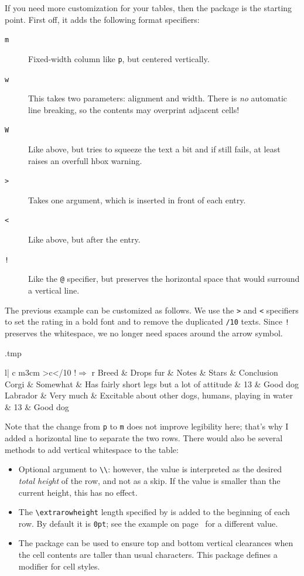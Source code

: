 If you need more customization for your tables, then the  package is the starting point.
First off, it adds the following format specifiers:
\begin{description}
\item[\texttt{m}] Fixed-width column like \verb|p|, but centered vertically.
\item[\texttt{w}] This takes two parameters: alignment and width.
    There is \emph{no} automatic line breaking,
    so the contents may overprint adjacent cells!
\item[\texttt{W}] Like above, but tries to squeeze the text a bit and if still fails,
    at least raises an overfull hbox warning.
\item[\texttt{>}] Takes one argument, which is inserted in front of each entry.
\item[\texttt{<}] Like above, but after the entry.
\item[\texttt{!}] Like the \verb|@| specifier,
    but preserves the horizontal space that would surround a vertical line.
\end{description}

The previous example can be customized as follows.
We use the \verb|>| and \verb|<| specifiers to set the rating in a bold font
and to remove the duplicated \verb|/10| texts.
Since \verb|!| preserves the whitespace,
we no longer need spaces around the arrow symbol.
%
\begin{VerbatimOut}{\jobname.tmp}
\begin{tabular}{l| c m{3cm} >{\bfseries}c<{/10} !{$\Rightarrow$} r}
Breed & Drops fur & Notes & Stars & Conclusion\\
\hline
Corgi & Somewhat & Has fairly short legs but a lot of attitude
    & 13 & Good dog\\
\hline
Labrador & Very much & Excitable about other dogs, humans, playing in water
    & 13 & Good dog
\end{tabular}
\end{VerbatimOut}
\ShowExampleBelow
%
Note that the change from \texttt{p} to \texttt{m} does not improve legibility here;
that's why I added a horizontal line to separate the two rows.
There would also be several methods to add vertical whitespace to the table:
\begin{itemize}
\item Optional argument to \verb|\\|:
    however, the value is interpreted as the desired \emph{total height} of the row,
    and not as a skip.
    If the value is smaller than the current height, this has no effect.
\item The \verb|\extrarowheight| length specified by 
    is added to the beginning of each row.
    By default it is \verb|0pt|;
    see the example on page~\pageref{ex:extrarowheight} for a different value.
\item The  package can be used to ensure top and bottom vertical clearances
    when the cell contents are taller than usual characters.
    This package defines a modifier for cell styles.
\end{itemize}

